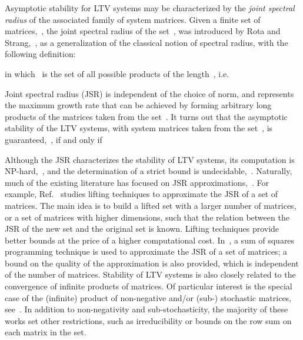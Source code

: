 \documentclass[draftclsnofoot, onecolumn, 12pt]{IEEEtran}
\begin{document}
Asymptotic stability for LTV systems may be characterized by the \textit{joint spectral radius} of the associated family of system matrices. Given a finite set of matrices,~, the joint spectral radius of the set~, was introduced by Rota and Strang,~\cite{rota1960note}, as a generalization of the classical notion of spectral radius, with the following definition:

in which~ is the set of all possible products of the length~, i.e.

Joint spectral radius (JSR) is independent of the choice of norm, and represents the maximum growth rate that can be achieved by forming arbitrary long products of the matrices taken from the set~. It turns out that the asymptotic stability of the LTV systems, with system matrices taken from the set~, is guaranteed,~\cite{parrilo2008approximation}, if and only if

  
Although the JSR characterizes the stability of LTV systems, its computation is NP-hard,~\cite{tsitsiklis1997lyapunov}, and the determination of a strict bound is undecidable,~\cite{blondel2000boundedness}. Naturally, much of the existing literature has focused on JSR approximations,~\cite{parrilo2008approximation,gripenberg1996computing,blondel2000boundedness,jungers2009joint,blondel2005computationally,tsitsiklis1997lyapunov,qu2005products,touri2011product}. For example, Ref.~\cite{blondel2005computationally} studies lifting techniques  to approximate the JSR of a set of matrices. The main idea is to build a lifted set with a larger number of matrices, or a set of matrices with higher dimensions, such that the relation between the JSR of the new set and the original set is known. Lifting techniques provide better bounds at the price of a higher computational cost. In~\cite{parrilo2008approximation}, a sum of squares programming technique is used  to approximate the JSR of a set of matrices; a bound on the quality of the approximation is also provided, which is independent of the number of matrices. Stability of LTV systems is also closely related to the convergence of infinite products of matrices. Of particular interest is the special case of the (infinite) product of non-negative and/or (sub-) stochastic matrices, see~\cite{guu2003convergence,daubechies1992sets,bru1994convergence,beyn1997infinite,hartfiel1974infinite,pullman1966infinite,kochkarev1995continuous,Elsner1997133}. In addition to non-negativity and sub-stochasticity, the majority of these works set other restrictions, such as irreducibility or bounds on the row sum on each matrix in the set. 
\end{document}
